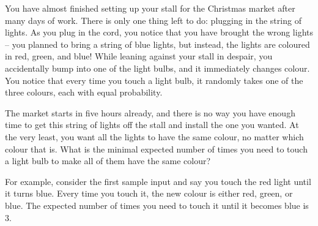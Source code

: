 


You have almost finished setting up your stall for the Christmas market after many days of work.
There is only one thing left to do: plugging in the string of lights.
As you plug in the cord, you notice that you have brought the wrong lights --
you planned to bring a string of blue lights,
but instead, the lights are coloured in red, green, and blue!
While leaning against your stall in despair,
you accidentally bump into one of the light bulbs,
and it immediately changes colour.
You notice that every time you touch a light bulb, it randomly takes one of the three colours,
each with equal probability.

The market starts in five hours already,
and there is no way you have enough time to get this string of lights off the stall
and install the one you wanted.
At the very least, you want all the lights to have the same colour, no matter
which colour that is.
What is the minimal expected number of times you need to touch a light bulb
to make all of them have the same colour?

For example, consider the first sample input
and say you touch the red light until it turns blue.
Every time you touch it, the new colour is either red, green, or blue.
The expected number of times you need to touch it until it becomes blue is $3$.

